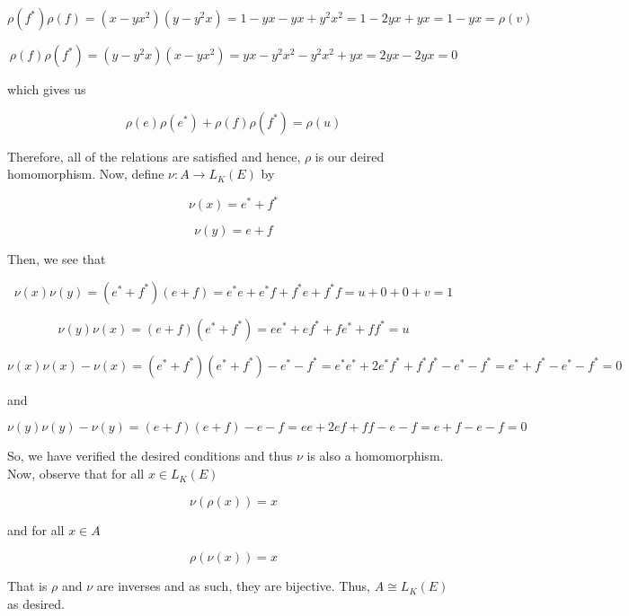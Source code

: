 \begin{solution}
    $$\rho(f^*)\rho(f)=(x-yx^2)(y-y^2x)=1-yx-yx+y^2x^2=1-2yx+yx=1-yx=\rho(v)$$

    $$\rho(f)\rho(f^*)=(y-y^2x)(x-yx^2)=yx-y^2x^2-y^2x^2+yx=2yx-2yx=0$$
    
    which gives us

    $$\rho(e)\rho(e^*)+\rho(f)\rho(f^*)=\rho(u)$$

    Therefore, all of the relations are satisfied and hence, $\rho$ is our deired homomorphism. Now,
    define $\nu:A\to L_K(E)$ by

    $$\nu(x)=e^*+f^*$$

    $$\nu(y)=e+f$$

    Then, we see that

    $$\nu(x)\nu(y)=(e^*+f^*)(e+f)=e^*e+e^*f+f^*e+f^*f=u+0+0+v=1$$

    $$\nu(y)\nu(x)=(e+f)(e^*+f^*)=ee^*+ef^*+fe^*+ff^*=u$$

    $$\nu(x)\nu(x)-\nu(x)=(e^*+f^*)(e^*+f^*)-e^*-f^*=e^*e^*+2e^*f^*+f^*f^*-e^*-f^*=e^*+f^*-e^*-f^*=0$$

    and

    $$\nu(y)\nu(y)-\nu(y)=(e+f)(e+f)-e-f=ee+2ef+ff-e-f=e+f-e-f=0$$

    So, we have verified the desired conditions and thus $\nu$ is also a homomorphism. Now, observe that
    for all $x\in L_K(E)$

    $$\nu(\rho(x))=x$$

    and for all $x\in A$

    $$\rho(\nu(x))=x$$

    That is $\rho$ and $\nu$ are inverses and as such, they are bijective. Thus, $A\cong L_K(E)$ as
    desired.

\end{solution}